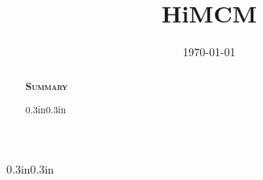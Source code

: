 \documentclass{less-margins}
\title{HiMCM}
\date{\today}
\begin{document}
\begin{abstract}

\begin{center}
{\large\scshape\bfseries Summary}
\end{center}
\begin{changemargin}{0.3in}{0.3in} 

\end{changemargin} 
\end{abstract}

\maketitle






\begin{changemargin}{0.3in}{0.3in}
{%
\tableofcontents
}
\end{changemargin}

\setlength{\parskip}{0.05em}

\newpage


















\newpage



{\scriptsize

}

\pagebreak


\end{document}
